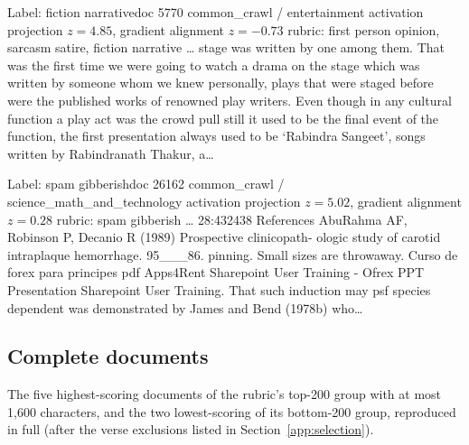 \begin{docbox}{Label: fiction narrative}{doc 5770 \textbullet{} common\_crawl / entertainment \textbullet{} activation projection $z=4.85$, gradient alignment $z=-0.73$ \textbullet{} rubric: first person opinion, sarcasm satire, fiction narrative}
\ldots{} stage was written by one among them. That was the first time we were going to watch a drama on the stage which was written by someone whom we knew personally, plays that were staged before were the published works of renowned play writers.  Even though in any cultural function a play act was the crowd pull still it used to be the final event of the function, the first presentation always used to be ‘Rabindra Sangeet’, songs written by Rabindranath Thakur, a\ldots{}
\end{docbox}

\begin{docbox}{Label: spam gibberish}{doc 26162 \textbullet{} common\_crawl / science\_math\_and\_technology \textbullet{} activation projection $z=5.02$, gradient alignment $z=0.28$ \textbullet{} rubric: spam gibberish}
\ldots{} 28:432438 References AbuRahma AF, Robinson P, Decanio R (1989) Prospective clinicopath- ologic study of carotid intraplaque hemorrhage. 95\_\_\_86. pinning. Small sizes are throwaway.  Curso de forex para principes pdf Apps4Rent Sharepoint User Training - Ofrex PPT Presentation Sharepoint User Training. That such induction may psf species dependent was demonstrated by James and Bend (1978b) who\ldots{}
\end{docbox}

\subsection{Complete documents}\label{app:full}
The five highest-scoring documents of the rubric's top-200 group with at most 1{,}600 characters, and the two lowest-scoring of its bottom-200 group, reproduced in full (after the verse exclusions listed in Section~\ref{app:selection}).


